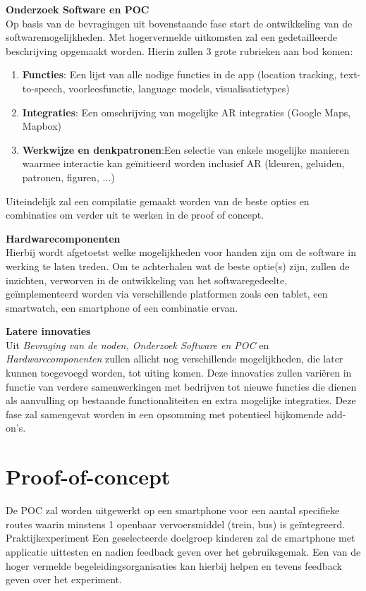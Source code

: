 \documentclass{hogent-article}
\begin{document}
    \textbf{Onderzoek Software en POC} \\
    Op basis van de bevragingen uit bovenstaande fase start de ontwikkeling van de softwaremogelijkheden. Met hogervermelde uitkomsten zal een gedetailleerde beschrijving opgemaakt worden. Hierin zullen 3 grote rubrieken aan bod komen:
    \begin{enumerate}
        \item \textbf{Functies}: Een lijst van alle nodige functies in de app (location tracking, text-to-speech, voorleesfunctie, language models, visualisatietypes)
        \item \textbf{Integraties}: Een omschrijving van mogelijke AR integraties (Google Maps, Mapbox)
        \item \textbf{Werkwijze en denkpatronen}:Een selectie van enkele mogelijke manieren waarmee interactie kan geïnitieerd worden inclusief AR (kleuren, geluiden, patronen, figuren, ...)
    \end{enumerate}
    Uiteindelijk zal een compilatie gemaakt worden van de beste opties en combinaties om verder uit te werken in de proof of concept.
    
    \textbf{Hardwarecomponenten} \\
    Hierbij wordt afgetoetst welke mogelijkheden voor handen zijn om de software in werking te laten treden. Om te achterhalen wat de beste optie(s) zijn, zullen de inzichten, verworven in de ontwikkeling van het softwaregedeelte, geïmplementeerd worden via verschillende platformen zoals een tablet, een smartwatch, een smartphone of een combinatie ervan.
    
    \textbf{Latere innovaties} \\
    Uit \emph{Bevraging van de noden, Onderzoek Software en POC} en \emph{Hardwarecomponenten} zullen allicht nog verschillende mogelijkheden, die later kunnen toegevoegd worden, tot uiting komen. Deze innovaties zullen variëren in functie van verdere samenwerkingen met bedrijven tot nieuwe functies die dienen als aanvulling op bestaande functionaliteiten en extra mogelijke integraties. Deze fase zal samengevat worden in een opsomming met potentieel bijkomende add-on's.
    
    \section{Proof-of-concept}%
    \label{sec:proof-of-concept}
    De POC zal worden uitgewerkt op een smartphone voor een aantal specifieke routes waarin minstens 1 openbaar vervoersmiddel (trein, bus) is geïntegreerd.
  Praktijkexperiment
  Een geselecteerde doelgroep kinderen zal de smartphone met applicatie uittesten en nadien feedback geven over het gebruiksgemak. Een van de hoger vermelde begeleidingsorganisaties kan hierbij helpen en tevens feedback geven over het experiment.
\end{document}
